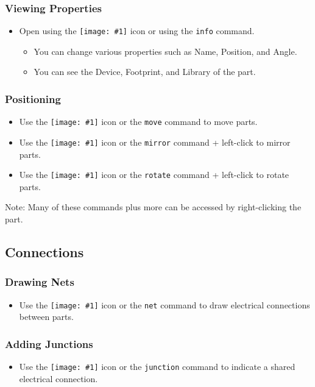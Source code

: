 \documentclass{article}
\newcommand{\icon}[1]{\texttt{[image: \#1]}}
\begin{document}
\subsubsection{Viewing Properties}
\begin{itemize}
    \item Open using the \icon{info.png} icon or using the \texttt{info} command.
    \begin{itemize}
        \item You can change various properties such as Name, Position, and Angle.
        \item You can see the Device, Footprint, and Library of the part.
    \end{itemize}
\end{itemize}
\subsubsection{Positioning}
\begin{itemize}
    \item Use the \icon{move.png} icon or the \texttt{move} command to move parts.
    \item Use the \icon{mirror.png} icon or the \texttt{mirror} command + left-click to mirror parts.
    \item Use the \icon{rotate.png} icon or the \texttt{rotate} command + left-click to rotate parts.
\end{itemize}
Note: Many of these commands plus more can be accessed by right-clicking the part.

\subsection{Connections}
\subsubsection{Drawing Nets}
\begin{itemize}
    \item Use the \icon{net.png} icon or the \texttt{net} command to draw electrical connections between parts.
\end{itemize}
\subsubsection{Adding Junctions}
\begin{itemize}
    \item Use the \icon{junction.png} icon or the \texttt{junction} command to indicate a shared electrical connection.
\end{itemize}
\end{document}
